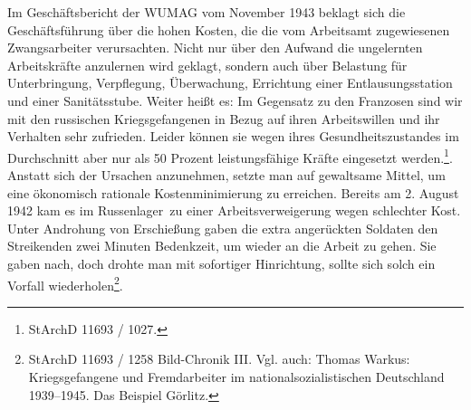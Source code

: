 \newline
Im Geschäftsbericht der WUMAG vom November 1943 beklagt sich die Geschäftsführung über die hohen Kosten, die die vom Arbeitsamt zugewiesenen Zwangsarbeiter verursachten. Nicht nur über den Aufwand die ungelernten Arbeitskräfte anzulernen wird geklagt, sondern auch über Belastung für Unterbringung, Verpflegung, Überwachung, Errichtung einer Entlausungsstation und einer Sanitätsstube. Weiter heißt es: \glqq Im Gegensatz zu den Franzosen sind wir mit den russischen Kriegsgefangenen in Bezug auf ihren Arbeitswillen und ihr Verhalten sehr zufrieden. Leider können sie wegen ihres Gesundheitszustandes im Durchschnitt aber nur als 50 Prozent leistungsfähige Kräfte eingesetzt werden.\grqq\footnote{StArchD 11693 / 1027.}. Anstatt sich der Ursachen anzunehmen, setzte man auf gewaltsame Mittel, um eine ökonomisch rationale Kostenminimierung zu erreichen.
Bereits am 2. August 1942 kam es im \glqq Russenlager\grqq~zu einer Arbeitsverweigerung wegen schlechter Kost. Unter Androhung von Erschießung gaben die extra angerückten Soldaten den Streikenden zwei Minuten Bedenkzeit, um wieder an die Arbeit zu gehen. Sie gaben nach, doch drohte man mit sofortiger Hinrichtung, sollte sich solch ein Vorfall wiederholen\footnote{StArchD 11693 / 1258 Bild-Chronik III. Vgl. auch: Thomas Warkus: Kriegsgefangene und Fremdarbeiter im nationalsozialistischen Deutschland 1939--1945. Das Beispiel Görlitz.}.

